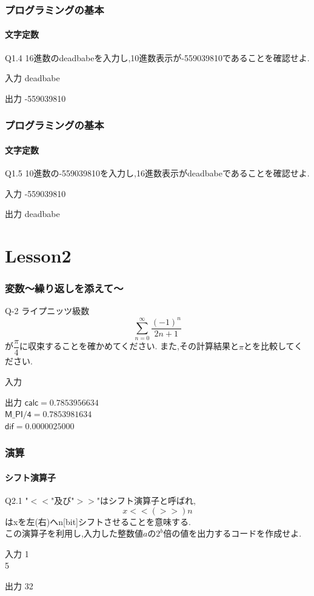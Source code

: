 \documentclass[dvipdfmx]{beamer}
\begin{document}
\begin{frame}
    \frametitle{プログラミングの基本}
    \framesubtitle{文字定数}
	\begin{itembox}[l]{Q1.4}
        16進数のdeadbabeを入力し,10進数表示が-559039810であることを確認せよ.
	\end{itembox}
	\begin{block}{入力}
        deadbabe
	\end{block}
	\begin{block}{出力}
        -559039810
	\end{block}
\end{frame}

\begin{frame}
    \frametitle{プログラミングの基本}
    \framesubtitle{文字定数}
	\begin{itembox}[l]{Q1.5}
        10進数の-559039810を入力し,16進数表示がdeadbabeであることを確認せよ.
	\end{itembox}
	\begin{block}{入力}
        -559039810
	\end{block}
	\begin{block}{出力}
        deadbabe
	\end{block}
\end{frame}

\section{Lesson2}
\begin{frame}
	\frametitle{変数～繰り返しを添えて～}
	\begin{itembox}[l]{Q-2}
		ライプニッツ級数
		$$\sum_{n=0}^{\infty}\frac{(-1)^n}{2n+1}$$
		が$\dfrac{\pi}{4}$に収束することを確かめてください.
		また,その計算結果と$\pi$とを比較してください.
	\end{itembox}
	\begin{block}{入力}
	\end{block}
	\begin{block}{出力}
		$\mathsf{calc = 0.7853956634}$\\
		$\mathsf{M\_PI/4 = 0.7853981634}$\\
		$\mathsf{dif = 0.0000025000}$
	\end{block}
\end{frame}

\begin{frame}
    \frametitle{演算}
    \framesubtitle{シフト演算子}
	\begin{itembox}[l]{Q2.1}
        "$<<$"及び"$>>$"はシフト演算子と呼ばれ,
        $$x <<(>>) n$$
        はxを左(右)へn[bit]シフトさせることを意味する.\\
        この演算子を利用し,入力した整数値$a$の$2^b$倍の値を出力するコードを作成せよ.
	\end{itembox}
	\begin{block}{入力}
        1\\
        5
	\end{block}
	\begin{block}{出力}
        32
	\end{block}
\end{frame}
\end{document}
